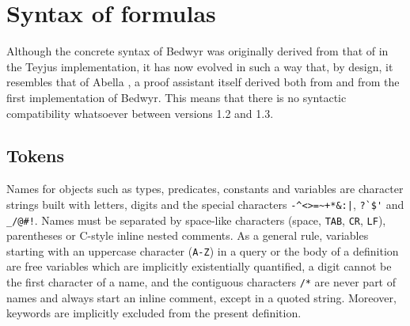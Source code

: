 



\section{Syntax of formulas}

Although the concrete syntax of Bedwyr was originally derived from that
of \lp{} in the Teyjus implementation\cite{nadathur99cade}, it has
now evolved in such a way that, by design, it resembles that of Abella
\cite{abella.website}, a
proof assistant itself derived both from \lp{} and from the first
implementation of Bedwyr. This means that there is no syntactic
compatibility whatsoever between versions 1.2 and 1.3.

\subsection{Tokens}

Names for objects such as types, predicates, constants and variables are
character strings built with letters, digits and the special characters
\verb.-^<>=~+*&:|., \verb.?`$'. and \verb._/@#!.. Names must be
separated by space-like characters (space, \verb.TAB., \verb.CR.,
\verb.LF.), parentheses or C-style inline nested comments.
As a general rule, variables starting with an uppercase character
(\verb.A-Z.) in a query or the body of a definition are free variables
which are implicitly existentially quantified, a digit cannot be the
first character of a name, and the contiguous characters \verb./*. are
never part of names and always start an inline comment, except in a
quoted string.
Moreover, keywords are implicitly excluded from the present definition.

